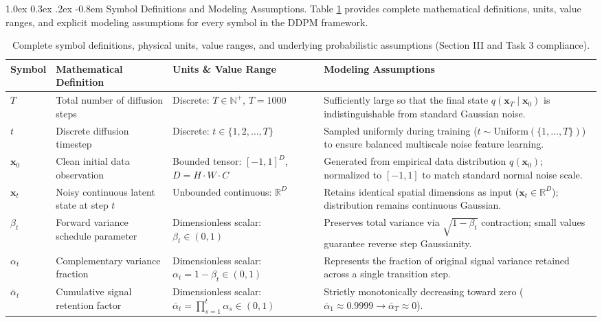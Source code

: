 \documentclass[10pt,a4paper]{article}
\makeatletter
\renewcommand\paragraph{\@startsection{paragraph}{4}{\z@}%
                                    {1.0ex \@plus 0.3ex \@minus .2ex}%
                                    {-0.8em}%
                                    {\normalfont\normalsize\bfseries}}
\makeatother
\begin{document}
\paragraph{Symbol Definitions and Modeling Assumptions.}
Table \ref{tab:symbol_definitions} provides complete mathematical definitions, units, value ranges, and explicit modeling assumptions for every symbol in the DDPM framework.

\begin{table}[htbp]
\centering
\caption{Complete symbol definitions, physical units, value ranges, and underlying probabilistic assumptions (Section III and Task 3 compliance).}
\label{tab:symbol_definitions}
\footnotesize
\begin{tabularx}{\textwidth}{l p{3.4cm} p{2.4cm} X}
\toprule
Symbol & Mathematical Definition & Units \& Value Range & Modeling Assumptions \\
\midrule
$T$ & Total number of diffusion steps & Discrete: $T \in \mathbb{N}^+$, $T=1000$ & Sufficiently large so that the final state $q(\mathbf{x}_T\mid\mathbf{x}_0)$ is indistinguishable from standard Gaussian noise. \\
$t$ & Discrete diffusion timestep & Discrete: $t \in \{1, 2, \dots, T\}$ & Sampled uniformly during training ($t \sim \text{Uniform}(\{1, \dots, T\})$) to ensure balanced multiscale noise feature learning. \\
$\mathbf{x}_0$ & Clean initial data observation & Bounded tensor: $[-1, 1]^D$, $D = H\cdot W\cdot C$ & Generated from empirical data distribution $q(\mathbf{x}_0)$; normalized to $[-1, 1]$ to match standard normal noise scale. \\
$\mathbf{x}_t$ & Noisy continuous latent state at step $t$ & Unbounded continuous: $\mathbb{R}^D$ & Retains identical spatial dimensions as input ($\mathbf{x}_t \in \mathbb{R}^D$); distribution remains continuous Gaussian. \\
$\beta_t$ & Forward variance schedule parameter & Dimensionless scalar: $\beta_t \in (0, 1)$ & Preserves total variance via $\sqrt{1-\beta_t}$ contraction; small values guarantee reverse step Gaussianity. \\
$\alpha_t$ & Complementary variance fraction & Dimensionless scalar: $\alpha_t = 1 - \beta_t \in (0, 1)$ & Represents the fraction of original signal variance retained across a single transition step. \\
$\bar{\alpha}_t$ & Cumulative signal retention factor & Dimensionless scalar: $\bar{\alpha}_t = \prod_{s=1}^t \alpha_s \in (0, 1)$ & Strictly monotonically decreasing toward zero ($\bar{\alpha}_1 \approx 0.9999 \to \bar{\alpha}_T \approx 0$). \\

\end{tabularx}
\end{table}
\end{document}
